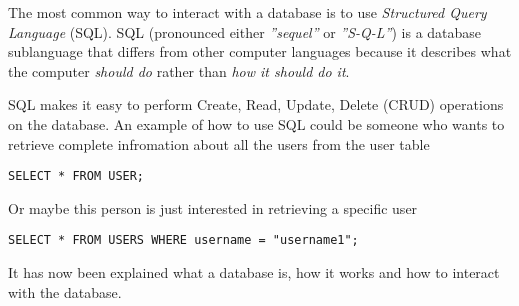 The most common way to interact with a database is to use \textit{Structured Query Language} (SQL).
SQL (pronounced either \textit{''sequel''} or \textit{''S-Q-L''}) is a database sublanguage that differs from other computer languages because it describes what the computer \textit{should do} rather than \textit{how it should do it}.\cite{SQLIntroduction}

SQL makes it easy to perform Create, Read, Update, Delete (CRUD) operations on the database.\cite{OracleWhatIsDatabase}
An example of how to use SQL could be someone who wants to retrieve complete infromation about all the users from the user table

\begin{lstlisting}[caption={An SQL query that fetches complete information for every user}, label=lstSQL-user1]
SELECT * FROM USER;
\end{lstlisting}

Or maybe this person is just interested in retrieving a specific user

\begin{lstlisting}[caption={An SQL query that only fetches complete information for username1}, label=lstSQL-user2]
SELECT * FROM USERS WHERE username = "username1";
\end{lstlisting}

It has now been explained what a database is, how it works and how to interact with the database.

